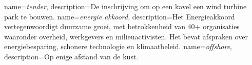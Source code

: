 \printglossaries
{}
{
    name=\textit{tender},
    description={De inschrijving om op een kavel een wind turbine park te bouwen.}
}
{
    name=\textit{energie akkoord},
    description={Het Energieakkoord vertegenwoordigt duurzame groei, met betrokkenheid van 40+ organisaties waaronder overheid, werkgevers en milieuactivisten. Het bevat afspraken over energiebesparing, schonere technologie en klimaatbeleid.}
}
{
    name=\textit{offshore},
    description={Op enige afstand van de kust.}
}